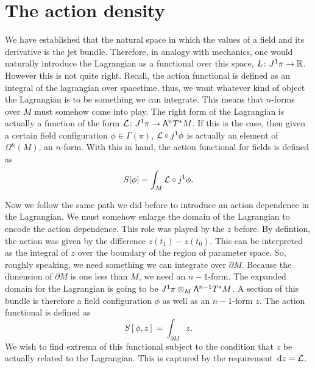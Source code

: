 \documentclass[../main.tex]{subfiles}
\begin{document}
\section{The action density}
We have established that the natural space in which the values of a field and its
derivative is the jet bundle. Therefore, in analogy with mechanics, one would naturally
introduce the Lagrangian as a functional over this space, \( L \colon J^1 \pi \to \mathbb{R} \).
However this is not quite right. Recall, the action functional is defined as an integral
of the lagrangian over spacetime. thus, we want whatever kind of object the Lagrangian is
to be something we can integrate. This means that \( n \)-forms over \( M \) must somehow
come into play. The right form of the Lagrangian is actually a function of the form \( \mathcal{L}
\colon J^1\pi \to \mathsf{\Lambda}^n T^\ast M \). If this is the case, then given a certain field
configuration \( \phi \in \Gamma(\pi) \), \( \mathcal{L} \circ j^1 \phi \) is actually an element
of \( \Omega^n(M) \), an \( n \)-form. With this in hand, the action functional for fields
is defined as 
\begin{equation*}
	S[\phi] = \int_{M} \mathcal{L} \circ j^1\phi. 
\end{equation*}

Now we follow the same path we did before to introduce an action dependence in the
Lagrangian. We must somehow enlarge the domain of the Lagrangian to encode the action
dependence. This role was played by the \( z \) before. By defintion, the action was given
by the difference \( z(t_1) - z(t_0) \). This can be interpreted as the integral of \( z
\) over the boundary of the region of parameter space. So, roughly speaking, we need
something we can integrate over \( \partial M \). Because the dimension of \( \partial M
\) is one less than \( M \), we need an \( n-1 \)-form. The expanded domain for the
Lagrangian is going to be \( J^1 \pi \otimes_M \mathsf{\Lambda}^{n-1} T^\ast M \). A section of this
bundle is therefore a field configuration \( \phi \) as well as an \( n-1 \)-form \( z \).
The action functional is defined as
\begin{equation*}
	S[\phi, z] = \int_{\partial M} z.
\end{equation*}
We wish to find extrema of this functional subject to the condition that \( z \) be
actually related to the Lagrangian. This is captured by the requirement \( \,\mathrm{d} z = \mathcal{L} \).
\end{document}
